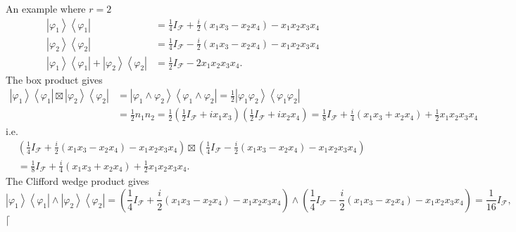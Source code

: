 \documentclass[aps,preprint]{revtex4}%
\begin{document}
An example where $r=2$
\begin{align}
\left\vert \varphi_{1}\right\rangle \left\langle \varphi_{1}\right\vert  &
=\frac{1}{4}I_{\mathcal{F}}+\frac{i}{2}\left(  x_{1}x_{3}-x_{2}x_{4}\right)
-x_{1}x_{2}x_{3}x_{4}\\
\left\vert \varphi_{2}\right\rangle \left\langle \varphi_{2}\right\vert  &
=\frac{1}{4}I_{\mathcal{F}}-\frac{i}{2}\left(  x_{1}x_{3}-x_{2}x_{4}\right)
-x_{1}x_{2}x_{3}x_{4}\\
\left\vert \varphi_{1}\right\rangle \left\langle \varphi_{1}\right\vert
+\left\vert \varphi_{2}\right\rangle \left\langle \varphi_{2}\right\vert  &
=\frac{1}{2}I_{\mathcal{F}}-2x_{1}x_{2}x_{3}x_{4}.
\end{align}
The box product gives
\begin{align}
\left\vert \varphi_{1}\right\rangle \left\langle \varphi_{1}\right\vert
\boxtimes\left\vert \varphi_{2}\right\rangle \left\langle \varphi
_{2}\right\vert  &  =\left\vert \varphi_{1}\wedge\varphi_{2}\right\rangle
\left\langle \varphi_{1}\wedge\varphi_{2}\right\vert =\frac{1}{2}\left\vert
\varphi_{1}\varphi_{2}\right\rangle \left\langle \varphi_{1}\varphi
_{2}\right\vert \\
&  =\frac{1}{2}n_{1}n_{2}=\frac{1}{2}\left(  \frac{1}{2}I_{\mathcal{F}}%
+ix_{1}x_{3}\right)  \left(  \frac{1}{2}I_{\mathcal{F}}+ix_{2}x_{4}\right)
=\frac{1}{8}I_{\mathcal{F}}+\frac{i}{4}\left(  x_{1}x_{3}+x_{2}x_{4}\right)
+\frac{1}{2}x_{1}x_{2}x_{3}x_{4}%
\end{align}
i.e.
\begin{align}
&  \left(  \frac{1}{4}I_{\mathcal{F}}+\frac{i}{2}\left(  x_{1}x_{3}-x_{2}%
x_{4}\right)  -x_{1}x_{2}x_{3}x_{4}\right)  \boxtimes\left(  \frac{1}%
{4}I_{\mathcal{F}}-\frac{i}{2}\left(  x_{1}x_{3}-x_{2}x_{4}\right)
-x_{1}x_{2}x_{3}x_{4}\right)  \\
&  =\frac{1}{8}I_{\mathcal{F}}+\frac{i}{4}\left(  x_{1}x_{3}+x_{2}%
x_{4}\right)  +\frac{1}{2}x_{1}x_{2}x_{3}x_{4}.
\end{align}
The Clifford wedge product gives
\[
\left\vert \varphi_{1}\right\rangle \left\langle \varphi_{1}\right\vert
\wedge\left\vert \varphi_{2}\right\rangle \left\langle \varphi_{2}\right\vert
=\left(  \frac{1}{4}I_{\mathcal{F}}+\frac{i}{2}\left(  x_{1}x_{3}-x_{2}%
x_{4}\right)  -x_{1}x_{2}x_{3}x_{4}\right)  \wedge\left(  \frac{1}%
{4}I_{\mathcal{F}}-\frac{i}{2}\left(  x_{1}x_{3}-x_{2}x_{4}\right)
-x_{1}x_{2}x_{3}x_{4}\right)  =\frac{1}{16}I_{\mathcal{F}},
\]
$\lceil$%
\end{document}
